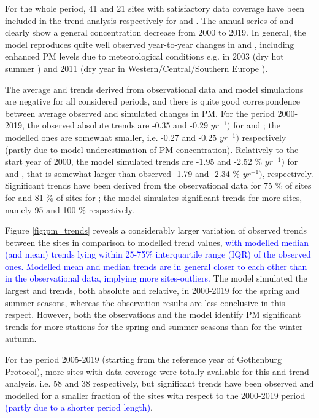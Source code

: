For the whole period, 41 and 21 sites with satisfactory data coverage have been included in the trend analysis respectively for \PM[10] and \PM[2.5]. The annual series of \PM[10] and \PM[2.5] clearly show a general concentration decrease from 2000 to 2019. In general, the model reproduces quite well observed year-to-year changes in \PM[10] and \PM[2.5], including enhanced PM levels due to meteorological conditions e.g. in 2003 (dry hot summer \citep{EMEP:PM2005}) and 2011 (dry year in Western/Central/Southern Europe \citep{EMEP:PM2013}).

The average \PM[10] and \PM[2.5] trends derived from observational data and model simulations are negative for all considered periods, and there is quite good correspondence between average observed and simulated changes in PM. %
For the period 2000-2019, the observed absolute trends are -0.35 and -0.29 \ug $yr^{-1})$ for \PM[10] and \PM[2.5]; the modelled ones are somewhat smaller, i.e. -0.27 and -0.25 \ug $yr^{-1})$ respectively (partly due to model underestimation of PM concentration).  Relatively to the start year of 2000, the model simulated trends are -1.95 and -2.52 \% $yr^{-1})$ for \PM[10] and \PM[2.5], that is somewhat larger than observed -1.79 and -2.34 \% $yr^{-1})$, respectively. Significant trends have been derived from the observational data for 75 \% of sites for \PM[10] and 81 \% of sites for \PM[2.5]; the model simulates significant trends for more sites, namely 95 and 100 \% respectively.  

Figure \ref{fig:pm_trends} reveals a considerably larger variation of observed trends between the sites in comparison to modelled trend values, \textcolor{blue}{with modelled median (and mean) trends lying within 25-75\% interquartile range (IQR) of the observed ones. Modelled mean and median trends are in general closer to each other than in the observational data, implying more sites-outliers.} 
The model simulated the largest \PM[10] and \PM[2.5] trends, both absolute and relative, in 2000-2019 for the spring and summer seasons, whereas the observation results are less conclusive in this respect. However, both the observations and the model identify PM significant trends for more stations for the spring and summer seasons than for the winter-autumn. 


For the period 2005-2019 (starting from the reference year of Gothenburg Protocol), more sites with data coverage were totally available for this \PM[10] and \PM[2.5] trend analysis, i.e. 58 and 38 respectively, but significant trends have been observed and modelled for a smaller fraction of the sites with respect to the 2000-2019 period \textcolor{blue}{(partly due to a shorter period length)}.



\clearpage
\renewcommand\bibname{References}      %

